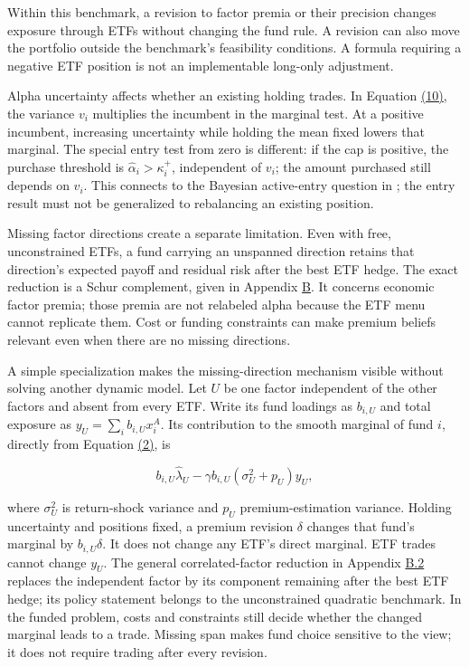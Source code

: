 \documentclass[11pt]{article}
\begin{document}
Within this benchmark, a revision to factor premia or their precision changes exposure through ETFs without changing the fund rule. A revision can also move the portfolio outside the benchmark's feasibility conditions. A formula requiring a negative ETF position is not an implementable long-only adjustment.

Alpha uncertainty affects whether an existing holding trades. In Equation \hyperref[eq:10]{(10)}, the variance \(v_i\) multiplies the incumbent in the marginal test. At a positive incumbent, increasing uncertainty while holding the mean fixed lowers that marginal. The special entry test from zero is different: if the cap is positive, the purchase threshold is \(\hat\alpha_i>\kappa_i^+\), independent of \(v_i\); the amount purchased still depends on \(v_i\). This connects to the Bayesian active-entry question in \cite{baks2001should}; the entry result must not be generalized to rebalancing an existing position.

Missing factor directions create a separate limitation. Even with free, unconstrained ETFs, a fund carrying an unspanned direction retains that direction's expected payoff and residual risk after the best ETF hedge. The exact reduction is a Schur complement, given in Appendix \hyperref[sec:B]{B}. It concerns economic factor premia; those premia are not relabeled alpha because the ETF menu cannot replicate them. Cost or funding constraints can make premium beliefs relevant even when there are no missing directions.

A simple specialization makes the missing-direction mechanism visible without solving another dynamic model. Let \(U\) be one factor independent of the other factors and absent from every ETF. Write its fund loadings as \(b_{i,U}\) and total exposure as \(y_U=\sum_i b_{i,U}x_i^A\). Its contribution to the smooth marginal of fund \(i\), directly from Equation \hyperref[eq:2]{(2)}, is

\begin{equation*}
b_{i,U}\hat\lambda_U
-\gamma b_{i,U}(\sigma_U^2+p_U)y_U,
\end{equation*}

where \(\sigma_U^2\) is return-shock variance and \(p_U\) premium-estimation variance. Holding uncertainty and positions fixed, a premium revision \(\delta\) changes that fund's marginal by \(b_{i,U}\delta\). It does not change any ETF's direct marginal. ETF trades cannot change \(y_U\). The general correlated-factor reduction in Appendix \hyperref[sec:B.2]{B.2} replaces the independent factor by its component remaining after the best ETF hedge; its policy statement belongs to the unconstrained quadratic benchmark. In the funded problem, costs and constraints still decide whether the changed marginal leads to a trade. Missing span makes fund choice sensitive to the view; it does not require trading after every revision.
\end{document}
